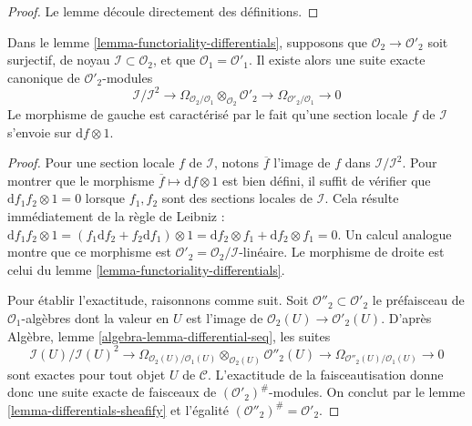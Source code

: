 \begin{proof}
Le lemme découle directement des définitions.
\end{proof}

\begin{lemma}

\label{lemma-differential-seq}
Dans le lemme \ref{lemma-functoriality-differentials}, supposons que
$\mathcal{O}_2 \to \mathcal{O}'_2$ soit surjectif, de noyau
$\mathcal{I} \subset \mathcal{O}_2$, et que
$\mathcal{O}_1 = \mathcal{O}'_1$. Il existe alors une suite exacte canonique
de $\mathcal{O}'_2$-modules
$$
\mathcal{I}/\mathcal{I}^2
\longrightarrow
\Omega_{\mathcal{O}_2/\mathcal{O}_1} \otimes_{\mathcal{O}_2} \mathcal{O}'_2
\longrightarrow
\Omega_{\mathcal{O}'_2/\mathcal{O}_1}
\longrightarrow
0
$$
Le morphisme de gauche est caractérisé par le fait qu'une section locale $f$
de $\mathcal{I}$ s'envoie sur $\text{d}f \otimes 1$.
\end{lemma}

\begin{proof}

Pour une section locale $f$ de $\mathcal{I}$, notons $\overline{f}$ l'image de
$f$ dans $\mathcal{I}/\mathcal{I}^2$. Pour montrer que le morphisme
$\overline{f} \mapsto \text{d}f \otimes 1$ est bien défini, il suffit de
vérifier que $\text{d} f_1f_2 \otimes 1 = 0$ lorsque $f_1, f_2$ sont des
sections locales de $\mathcal{I}$. Cela résulte immédiatement de la règle de
Leibniz :
$\text{d} f_1f_2 \otimes 1 =
(f_1 \text{d}f_2 + f_2 \text{d} f_1 )\otimes 1 =
\text{d}f_2 \otimes f_1 + \text{d}f_2 \otimes f_1 = 0$. Un calcul analogue
montre que ce morphisme est $\mathcal{O}'_2 = \mathcal{O}_2/\mathcal{I}$-linéaire.
Le morphisme de droite est celui du lemme
\ref{lemma-functoriality-differentials}.

\medskip\noindent
Pour établir l'exactitude, raisonnons comme suit. Soit
$\mathcal{O}''_2 \subset \mathcal{O}'_2$ le préfaisceau de
$\mathcal{O}_1$-algèbres dont la valeur en $U$ est l'image de
$\mathcal{O}_2(U) \to \mathcal{O}'_2(U)$. D'après Algèbre, lemme
\ref{algebra-lemma-differential-seq}, les suites
$$
\mathcal{I}(U)/\mathcal{I}(U)^2
\longrightarrow
\Omega_{\mathcal{O}_2(U)/\mathcal{O}_1(U)}
\otimes_{\mathcal{O}_2(U)} \mathcal{O}''_2(U)
\longrightarrow
\Omega_{\mathcal{O}''_2(U)/\mathcal{O}_1(U)}
\longrightarrow
0
$$
sont exactes pour tout objet $U$ de $\mathcal{C}$. L'exactitude de la
faisceautisation donne donc une suite exacte de faisceaux de
$(\mathcal{O}'_2)^\#$-modules. On conclut par le lemme
\ref{lemma-differentials-sheafify} et l'égalité
$(\mathcal{O}''_2)^\# = \mathcal{O}'_2$.
\end{proof}

